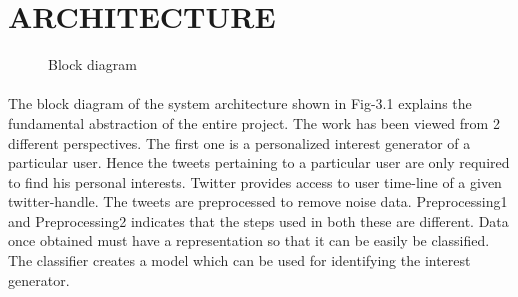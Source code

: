 \section{ARCHITECTURE}
\begin{figure}[!ht]

 \caption{Block diagram}
\end{figure}
\vspace{3cm}
\paragraph{}


The block diagram of the system architecture shown in Fig-3.1 explains the fundamental abstraction of the entire project.
The work has been viewed from 2 different perspectives. The first one is a personalized interest generator of a particular user. Hence the tweets pertaining to a particular user are only required to find his personal interests. Twitter provides access to user time-line of a given twitter-handle. The tweets are preprocessed to remove noise data. Preprocessing1 and Preprocessing2 indicates that the steps used in both these are different. Data once obtained must have a representation so that it can be easily be classified. The classifier creates a model which can be used for identifying the interest generator.  

